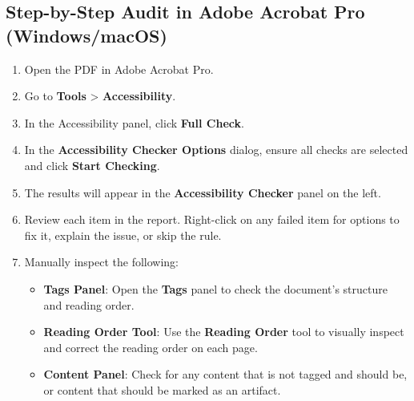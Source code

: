 \subsection{Step-by-Step Audit in Adobe Acrobat Pro (Windows/macOS)}
\label{subsec:audit-in-acrobat}
\begin{enumerate}
	\item Open the PDF in Adobe Acrobat Pro.
	\item Go to \textbf{Tools} > \textbf{Accessibility}.
	\item In the Accessibility panel, click \textbf{Full Check}.
	\item In the \textbf{Accessibility Checker Options} dialog, ensure all checks are selected and click \textbf{Start Checking}.
	\item The results will appear in the \textbf{Accessibility Checker} panel on the left.
	\item Review each item in the report. Right-click on any failed item for options to fix it, explain the issue, or skip the rule.
	\item Manually inspect the following:
	      \begin{itemize}
		      \item \textbf{Tags Panel}: Open the \textbf{Tags} panel to check the document's structure and reading order.
		      \item \textbf{Reading Order Tool}: Use the \textbf{Reading Order} tool to visually inspect and correct the reading order on each page.
		      \item \textbf{Content Panel}: Check for any content that is not tagged and should be, or content that should be marked as an artifact.
	      \end{itemize}
\end{enumerate}

